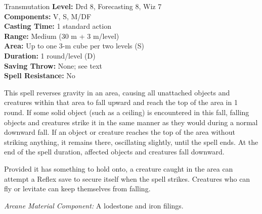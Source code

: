 {Transmutation}
{
	\textbf{Level:}
	Drd 8, Forecasting 8, Wiz 7\\
	\textbf{Components:}
	V, S, M/DF\\
	\textbf{Casting Time:}
	1 standard action\\
	\textbf{Range:}
	Medium (30 m + 3 m/level)\\
	\textbf{Area:}
	Up to one 3-m cube per two levels (S)\\
	\textbf{Duration:}
	1 round/level (D)\\
	\textbf{Saving Throw:}
	None; see text\\
	\textbf{Spell Resistance:}
	No\\
}
{
	This spell reverses gravity in an area, causing all unattached objects and creatures within that area to fall upward and reach the top of the area in 1 round. If some solid object (such as a ceiling) is encountered in this fall, falling objects and creatures strike it in the same manner as they would during a normal downward fall. If an object or creature reaches the top of the area without striking anything, it remains there, oscillating slightly, until the spell ends. At the end of the spell duration, affected objects and creatures fall downward.

	Provided it has something to hold onto, a creature caught in the area can attempt a Reflex save to secure itself when the spell strikes. Creatures who can fly or levitate can keep themselves from falling.

	\textit{Arcane Material Component:}
	A lodestone and iron filings.

}
